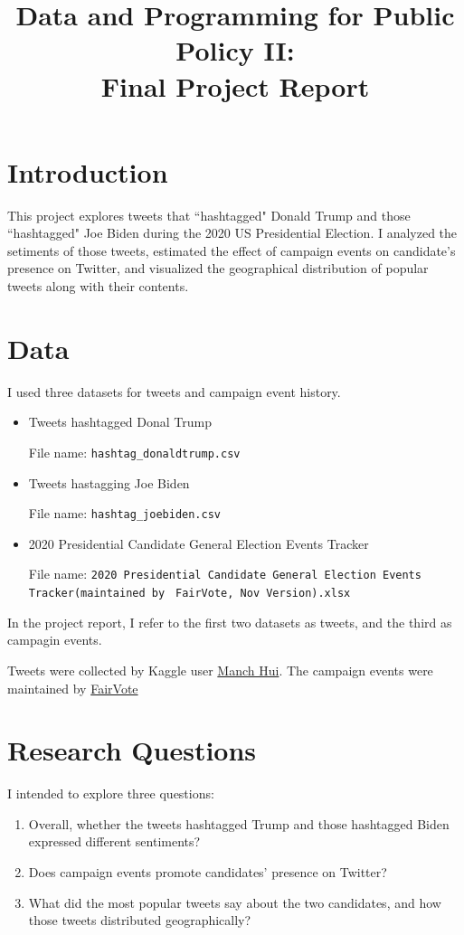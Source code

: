 \documentclass{article}
\title{Data and Programming for Public Policy II: \\ Final Project Report}
\begin{document}
\maketitle


\section{Introduction}

This project explores tweets that ``hashtagged" Donald Trump and those ``hashtagged" Joe Biden during the 2020 US Presidential Election. I analyzed the setiments of those tweets, estimated the effect of campaign events on candidate's presence on Twitter, and visualized the geographical distribution of popular tweets along with their contents.   

\section{Data}

I used three datasets for tweets and campaign event history. 
\begin{itemize}
	\item Tweets hashtagged Donal Trump
	
	File name: \verb|hashtag_donaldtrump.csv|
	
	\item Tweets hastagging Joe Biden
	
	File name: \verb|hashtag_joebiden.csv|
	
	\item 2020 Presidential Candidate General Election Events Tracker 
	
	File name: \verb|2020 Presidential Candidate General Election Events Tracker(maintained by|
	\verb| FairVote, Nov Version).xlsx|
\end{itemize}
In the project report, I refer to the first two datasets as tweets, and the third as campagin events.

Tweets were collected by Kaggle user \href{https://www.kaggle.com/manchunhui/us-election-2020-tweets}{Manch Hui}. The campaign events were maintained by \href{https://docs.google.com/spreadsheets/d/1oR_x3wGpFi1wO2V0BNMV529s_V-AgGH7tKd66DD7rrM/edit#gid=2025398596}{FairVote}
\section{Research Questions}

I intended to explore three questions: 
\begin{enumerate}
	\item Overall, whether the tweets hashtagged Trump and those hashtagged Biden expressed different sentiments?
	\item Does campaign events promote candidates' presence on Twitter?
	\item What did the most popular tweets say about the two candidates, and how those tweets distributed geographically?
\end{enumerate}
\end{document}
